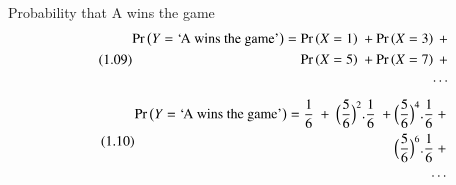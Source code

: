 \documentclass[journal,12pt,twocolumn]{IEEEtran}
\begin{document}
Probability that A wins the game
\begin{align}\tag{1.09}
\begin{split}
    \Pr\left(Y=\text{`A wins the game'}\right) = \Pr\left(X=1\right)\ + \Pr\left(X=3\right)\ +\\ \Pr\left(X=5\right)\ + \Pr\left(X=7\right)\ +\\ \cdots
\end{split}
\end{align}
\begin{align}\tag{1.10}
    \begin{split}
        \pr{Y=\text{`A wins the game'}} = \dfrac{1}{6}\ +\ \Big(\dfrac{5}{6}\Big)^{2}.\dfrac{1}{6}\ + \Big(\dfrac{5}{6}\Big)^{4}.\dfrac{1}{6}\ +\\ \ \Big(\dfrac{5}{6}\Big)^{6}.\dfrac{1}{6}\ +\\ \ \cdots 
    \end{split}
\end{align}
\end{document}
